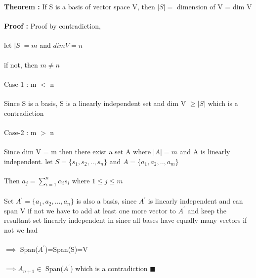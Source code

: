 \documentclass{article}
\begin{document}
    \textbf{Theorem : } If S is a basis of vector space V, then $|S| = $ dimension of V = dim V \\ \\
    \textbf{Proof : } Proof by contradiction, \\ \\
    let $|S| = m$ and $dim V = n$ \\ \\
    if not, then $m \neq n$ \\ \\
    Case-1 : m $<$ n \\ \\
    Since S is a basis, S is a linearly independent set and dim V $ \geq |S| $ which is a contradiction \\ \\
    Case-2 : m $>$ n \\ \\
    Since dim V = m then there exist a set A where $|A| = m$ and A is linearly independent. 
    let $S=\{s_1,s_2,..,s_n\}$ and $A=\{a_1,a_2,..,a_m\}$ \\ \\
    Then $a_j = \sum_{i=1}^n \alpha_i s_i$ where $1 \leq j \leq m$ \\ \\
    Set $A^{'}=\{a_1,a_2,...,a_n\}$ is also a basis, since $A^{'}$ is linearly independent and can span V if not we have to add at least one more vector to $A^{'}$ and keep the resultant set linearly independent in since all bases have equally many vectors if not we had \\ \\
    $\implies$ Span($A^{'}$)=Span(S)=V \\ \\
    $\implies A_{n+1} \in $ Span($A^{'}$) which is a contradiction    $\blacksquare$
\end{document}
